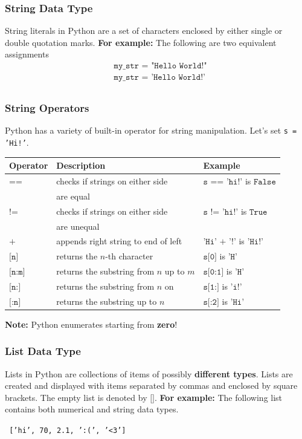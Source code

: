 \documentclass[12pt,t]{beamer}
\begin{document}
\begin{frame}
  \frametitle{String Data Type}
  String literals in Python are a set of characters enclosed by either single or double quotation marks.
  \vskip0.2cm
  \textbf{For example:} The following are two equivalent assignments
  \begin{align*}
  &\texttt{my\_str =  "Hello World!"}\\
  &\texttt{my\_str = 'Hello World!'}\\
  \end{align*}
\end{frame}

\begin{frame}  
  \frametitle{String Operators}
  \vskip-0.4cm
  Python has a variety of built-in operator for string manipulation.
  \vskip0.2cm
  Let's set \texttt{s = 'Hi!'}.
  \vskip0.2cm
  \scriptsize
  \renewcommand{\arraystretch}{1.5}
  \begin{tabular}{l l l}
  \textbf{Operator} & \textbf{Description} & \textbf{Example}\\
  \hline
  $\texttt{==}$ & {checks if strings on either side}& {$\texttt{s == 'hi!'}$ is $\texttt{False}$}\\
  & { are equal} &\\
  $\texttt{!=}$ & {checks if strings on either side} & {$\texttt{s != 
  'hi!'}$ is $\texttt{True}$}\\
  & { are unequal} &\\
  $\texttt{+}$ & {appends right string to end of left} & {$\texttt{'Hi' + '!'}$ is $\texttt{'Hi!'}$}\\
  $\texttt{[n]}$ & {returns the $n$-th character} & {$\texttt{s[0]}$ is $\texttt{'H'}$}\\
  $\texttt{[n:m]}$ & {returns the substring from $n$ up to $m$} & {$\texttt{s[0:1]}$ is $\texttt{'H'}$}\\
  $\texttt{[n:]}$ & {returns the substring from $n$ on} & {$\texttt{s[1:]}$ is $\texttt{'i!'}$}\\
  $\texttt{[:n]}$ & {returns the substring up to $n$} & {$\texttt{s[:2]}$ is $\texttt{'Hi'}$}\\
  \end{tabular}
  \vskip0.2cm
  \normalsize
  \textbf{Note:} Python enumerates starting from \textbf{zero}!
\end{frame}

\begin{frame}
  \frametitle{List Data Type}
Lists in Python are collections of items of possibly \textbf{different types}. Lists are created and displayed with items separated by commas and enclosed by square brackets. The empty list is denoted by $\texttt{[]}$.
  \vskip0.2cm
  \textbf{For example:} The following list contains both numerical and string data types.
  \begin{center}
  \texttt{ ['hi', 70, 2.1, ':(', '<3']}
  \end{center}
\end{frame}
\end{document}
